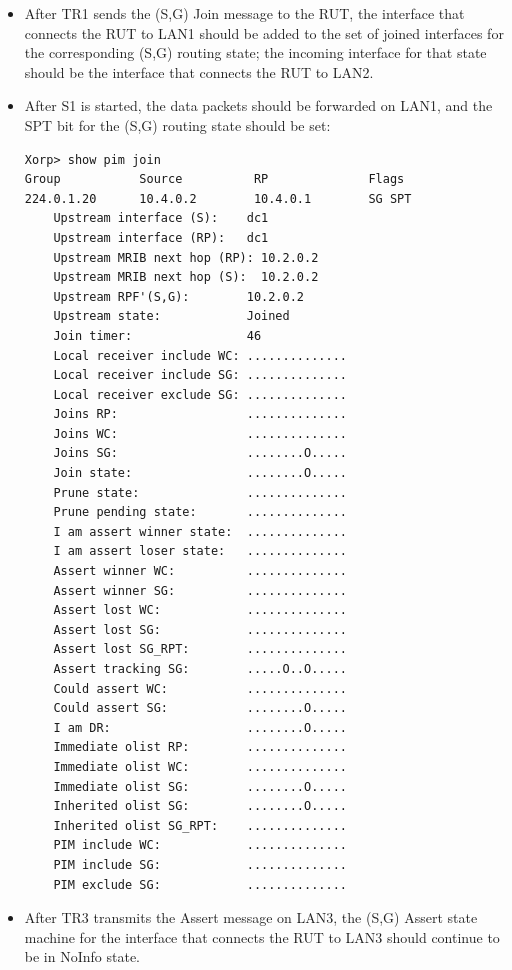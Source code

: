 \documentclass[11pt]{report}
\begin{document}
\begin{itemize}

  \item After TR1 sends the (S,G) Join message to the RUT, the interface that
  connects the RUT to LAN1 should be added to the set of joined interfaces for
  the corresponding (S,G) routing state; the incoming interface for that state
  should be the interface that connects the RUT to LAN2.

  \item After S1 is started, the data packets should be forwarded on LAN1,
  and the SPT bit for the (S,G) routing state should be set:

\begin{verbatim}
Xorp> show pim join 
Group           Source          RP              Flags
224.0.1.20      10.4.0.2        10.4.0.1        SG SPT 
    Upstream interface (S):    dc1
    Upstream interface (RP):   dc1
    Upstream MRIB next hop (RP): 10.2.0.2
    Upstream MRIB next hop (S):  10.2.0.2
    Upstream RPF'(S,G):        10.2.0.2
    Upstream state:            Joined 
    Join timer:                46
    Local receiver include WC: ..............
    Local receiver include SG: ..............
    Local receiver exclude SG: ..............
    Joins RP:                  ..............
    Joins WC:                  ..............
    Joins SG:                  ........O.....
    Join state:                ........O.....
    Prune state:               ..............
    Prune pending state:       ..............
    I am assert winner state:  ..............
    I am assert loser state:   ..............
    Assert winner WC:          ..............
    Assert winner SG:          ..............
    Assert lost WC:            ..............
    Assert lost SG:            ..............
    Assert lost SG_RPT:        ..............
    Assert tracking SG:        .....O..O.....
    Could assert WC:           ..............
    Could assert SG:           ........O.....
    I am DR:                   ........O.....
    Immediate olist RP:        ..............
    Immediate olist WC:        ..............
    Immediate olist SG:        ........O.....
    Inherited olist SG:        ........O.....
    Inherited olist SG_RPT:    ..............
    PIM include WC:            ..............
    PIM include SG:            ..............
    PIM exclude SG:            ..............
\end{verbatim}

  \item After TR3 transmits the Assert message on LAN3, the (S,G) Assert state
  machine for the interface that connects the RUT to LAN3 should continue to
  be in NoInfo state.


\end{itemize}
\end{document}
